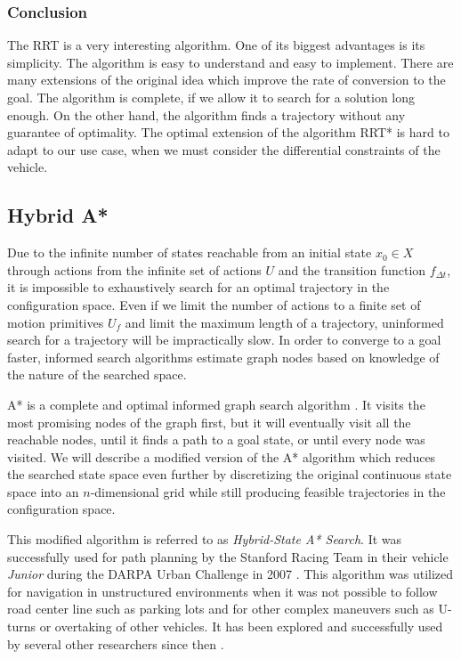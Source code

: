 \subsubsection{Conclusion}

The \gls*{RRT} is a very interesting algorithm. One of its biggest advantages is its simplicity. The algorithm is easy to understand and easy to implement. There are many extensions of the original idea which improve the rate of conversion to the goal. The algorithm is complete, if we allow it to search for a solution long enough. On the other hand, the algorithm finds a trajectory without any guarantee of optimality. The optimal extension of the algorithm \gls{RRT*} is hard to adapt to our use case, when we must consider the differential constraints of the vehicle.

\subsection{Hybrid A*}

Due to the infinite number of states reachable from an initial state $x_0\in X$ through actions from the infinite set of actions $U$ and the transition function $f_{\Delta t}$, it is impossible to exhaustively search for an optimal trajectory in the configuration space. Even if we limit the number of actions to a finite set of motion primitives $U_f$ and limit the maximum length of a trajectory, uninformed search for a trajectory will be impractically slow. In order to converge to a goal faster, informed search algorithms estimate graph nodes based on knowledge of the nature of the searched space.

A* is a complete and optimal informed graph search algorithm \cite{Nilsson_astar}. It visits the most promising nodes of the graph first, but it will eventually visit all the reachable nodes, until it finds a path to a goal state, or until every node was visited. We will describe a modified version of the A* algorithm which reduces the searched state space even further by discretizing the original continuous state space into an $n$-dimensional grid while still producing feasible trajectories in the configuration space.

This modified algorithm is referred to as \textit{Hybrid-State A* Search}. It was successfully used for path planning by the Stanford Racing Team in their vehicle \textit{Junior} during the DARPA Urban Challenge in 2007 \cite{dolgov08gppSTAIR}. This algorithm was utilized for navigation in unstructured environments when it was not possible to follow road center line such as parking lots and for other complex maneuvers such as U-turns or overtaking of other vehicles. It has been explored and successfully used by several other researchers since then \cite{Hybrid_astar}.

